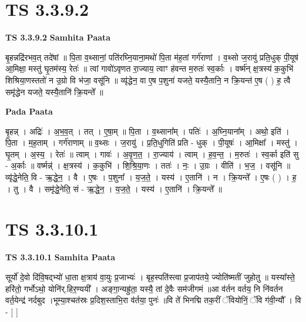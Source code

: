 \documentclass[17pt]{extarticle}
\begin{document}
\section*{ TS 3.3.9.2 }

\textbf{TS 3.3.9.2 } \newline
\textbf{Samhita Paata} \newline

बृ॒हन्नद्रि॑रभव॒त् तदे॑षां ॥ पि॒ता व॒थ्सानां॒ पति॑रघ्नि॒याना॒मथो॑ पि॒ता म॑ह॒तां गर्ग॑राणां । व॒थ्सो ज॒रायु॑ प्रति॒धुक् पी॒यूष॑ आ॒मिक्षा॒ मस्तु॑ घृ॒तम॑स्य॒ रेतः॑ ॥ त्वां गावो॑ऽवृणत रा॒ज्याय॒ त्वाꣳ ह॑वन्त म॒रुतः॑ स्व॒र्काः । वर्ष्म॑न् क्ष॒त्रस्य॑ क॒कुभि॑ शिश्रिया॒णस्ततो॑ न उ॒ग्रो वि भ॑जा॒ वसू॑नि ॥ व्यृ॑द्धेन॒ वा ए॒ष प॒शुना॑ यजते॒ यस्यै॒तानि॒ न क्रि॒यन्त॑ ए॒ष ( ) ह॒ त्वै समृ॑द्धेन यजते॒ यस्यै॒तानि॑ क्रि॒यन्ते᳚ ॥ \newline

\textbf{Pada Paata} \newline

बृ॒हन्न् । अद्रिः॑ । अ॒भ॒व॒त् । तत् । ए॒षा॒म् ॥ पि॒ता । व॒थ्साना᳚म् । पतिः॑ । अ॒घ्नि॒याना᳚म् । अथो॒ इति॑ । पि॒ता । म॒ह॒ताम् । गर्ग॑राणाम् ॥ व॒थ्सः । ज॒रायु॑ । प्र॒ति॒धुगिति॑ प्रति - धुक् । पी॒यूषः॑ । आ॒मिक्षा᳚ । मस्तु॑ । घृ॒तम् । अ॒स्य॒ । रेतः॑ ॥ त्वाम् । गावः॑ । अ॒वृ॒ण॒त॒ । रा॒ज्याय॑ । त्वाम् । ह॒व॒न्त॒ । म॒रुतः॑ । स्व॒र्का इति॑ सु - अ॒र्काः ॥ वर्ष्मन्न्॑ । क्ष॒त्रस्य॑ । क॒कुभि॑ । शि॒श्रि॒या॒णः । ततः॑ । नः॒ । उ॒ग्रः । वीति॑ । भ॒ज॒ । वसू॑नि ॥ व्यृ॑द्धे॒नेति॒ वि - ऋ॒द्धे॒न॒ । वै । ए॒षः । प॒शुना᳚ । य॒ज॒ते॒ । यस्य॑ । ए॒तानि॑ । न । क्रि॒यन्ते᳚ । ए॒षः ( ) । ह॒ । तु । वै । समृ॑द्धे॒नेति॒ सं - ऋ॒द्धे॒न॒ । य॒ज॒ते॒ । यस्य॑ । ए॒तानि॑ । क्रि॒यन्ते᳚ ॥  \newline




\section*{ TS 3.3.10.1 }

\textbf{TS 3.3.10.1 } \newline
\textbf{Samhita Paata} \newline

सूर्यो॑ दे॒वो दि॑वि॒षद्भ्यो॑ धा॒ता क्ष॒त्राय॑ वा॒युः प्र॒जाभ्यः॑ । बृह॒स्पति॑स्त्वा प्र॒जाप॑तये॒ ज्योति॑ष्मतीं जुहोतु ॥ यस्या᳚स्ते॒ हरि॑तो॒ गर्भोऽथो॒ योनि॑र्.हिर॒ण्ययी᳚ । अङ्गा॒न्यह्रु॑ता॒ यस्यै॒ तां दे॒वैः सम॑जीगमं ॥आ व॑र्तन वर्तय॒ नि नि॑वर्तन वर्त॒येन्द्र॑ नर्दबुद ।भूम्या॒श्चत॑स्रः प्र॒दिश॒स्ताभि॒रा व॑र्तया॒ पुनः॑ ॥वि ते॑ भिनद्मि तक॒रीं ॅवियोनिं॒ ॅवि ग॑वी॒न्यौ᳚ । वि - [  ] \newline
\end{document}
